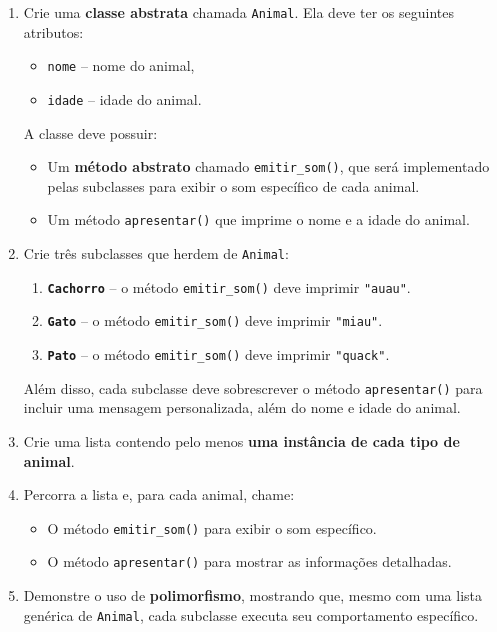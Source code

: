 \documentclass{article}
\begin{document}
\begin{enumerate}
    \item Crie uma \textbf{classe abstrata} chamada \texttt{Animal}.  
    Ela deve ter os seguintes atributos:
    \begin{itemize}
        \item \texttt{nome} -- nome do animal,
        \item \texttt{idade} -- idade do animal.
    \end{itemize}

    A classe deve possuir:
    \begin{itemize}
        \item Um \textbf{método abstrato} chamado \texttt{emitir\_som()}, que será implementado pelas subclasses para exibir o som específico de cada animal.
        \item Um método \texttt{apresentar()} que imprime o nome e a idade do animal.
    \end{itemize}

    \item Crie três subclasses que herdem de \texttt{Animal}:
    \begin{enumerate}
        \item \textbf{\texttt{Cachorro}} -- o método \texttt{emitir\_som()} deve imprimir \texttt{"auau"}.
        \item \textbf{\texttt{Gato}} -- o método \texttt{emitir\_som()} deve imprimir \texttt{"miau"}.
        \item \textbf{\texttt{Pato}} -- o método \texttt{emitir\_som()} deve imprimir \texttt{"quack"}.
    \end{enumerate}

    Além disso, cada subclasse deve sobrescrever o método \texttt{apresentar()} para incluir uma
    mensagem personalizada, além do nome e idade do animal.

    \item Crie uma lista contendo pelo menos \textbf{uma instância de cada tipo de animal}.

    \item Percorra a lista e, para cada animal, chame:
    \begin{itemize}
        \item O método \texttt{emitir\_som()} para exibir o som específico.
        \item O método \texttt{apresentar()} para mostrar as informações detalhadas.
    \end{itemize}

    \item Demonstre o uso de \textbf{polimorfismo}, mostrando que, mesmo com uma lista genérica de
    \texttt{Animal}, cada subclasse executa seu comportamento específico.
\end{enumerate}
\end{document}
